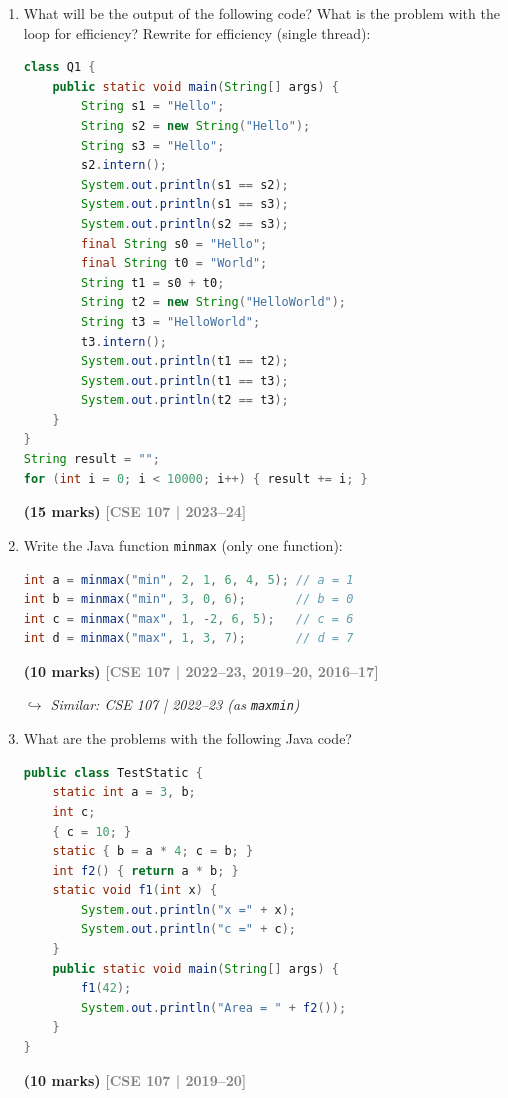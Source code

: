 \documentclass[12pt,a3paper]{article}
\newcommand{\yr}[1]{\hfill\textcolor{gray}{\small\textbf{[#1]}}}
\newcommand{\mk}[1]{\textcolor{orange!70!black}{\small\textbf{(#1 marks)}}}
\newcommand{\variant}[1]{\par\vspace{1pt}\textcolor{blue!50!black}%
  {\footnotesize\textit{$\hookrightarrow$ Similar: #1}}}
\begin{document}
\begin{enumerate}
\item What will be the output of the following code? What is the problem with the loop for efficiency? Rewrite for efficiency (single thread):
\begin{lstlisting}[language=Java]
class Q1 {
    public static void main(String[] args) {
        String s1 = "Hello";
        String s2 = new String("Hello");
        String s3 = "Hello";
        s2.intern();
        System.out.println(s1 == s2);
        System.out.println(s1 == s3);
        System.out.println(s2 == s3);
        final String s0 = "Hello";
        final String t0 = "World";
        String t1 = s0 + t0;
        String t2 = new String("HelloWorld");
        String t3 = "HelloWorld";
        t3.intern();
        System.out.println(t1 == t2);
        System.out.println(t1 == t3);
        System.out.println(t2 == t3);
    }
}
String result = "";
for (int i = 0; i < 10000; i++) { result += i; }
\end{lstlisting}
\mk{15}
\yr{CSE 107 | 2023--24}




\item Write the Java function \texttt{minmax} (only one function):
\begin{lstlisting}[language=Java]
int a = minmax("min", 2, 1, 6, 4, 5); // a = 1
int b = minmax("min", 3, 0, 6);       // b = 0
int c = minmax("max", 1, -2, 6, 5);   // c = 6
int d = minmax("max", 1, 3, 7);       // d = 7
\end{lstlisting}
\mk{10}
\yr{CSE 107 | 2022--23, 2019--20, 2016--17}
\variant{CSE 107 | 2022--23 (as \texttt{maxmin})}





\item What are the problems with the following Java code?
\begin{lstlisting}[language=Java]
public class TestStatic {
    static int a = 3, b;
    int c;
    { c = 10; }
    static { b = a * 4; c = b; }
    int f2() { return a * b; }
    static void f1(int x) {
        System.out.println("x =" + x);
        System.out.println("c =" + c);
    }
    public static void main(String[] args) {
        f1(42);
        System.out.println("Area = " + f2());
    }
}
\end{lstlisting}
\mk{10}
\yr{CSE 107 | 2019--20}


\end{enumerate}
\end{document}
